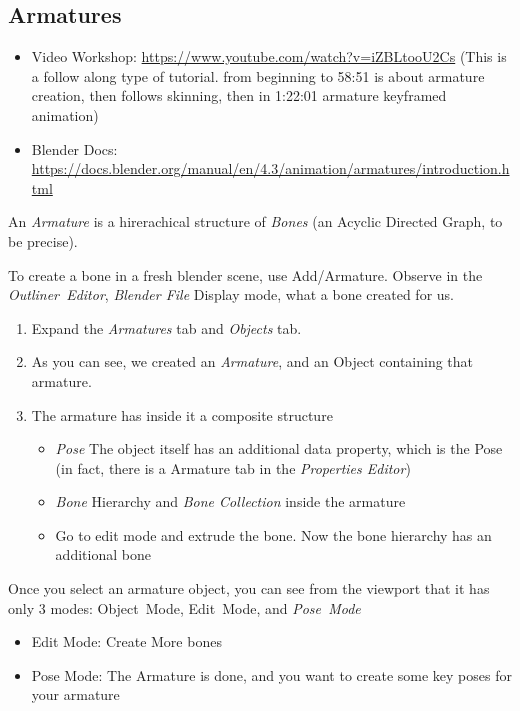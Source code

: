 \documentclass{article}
\begin{document}
\subsection{Armatures}
\begin{itemize}[noitemsep, topsep=0pt]
    \item Video Workshop: \href{https://www.youtube.com/watch?v=iZBLtooU2Cs}{https://www.youtube.com/watch?v=iZBLtooU2Cs} (This is a follow along type of tutorial. from beginning to 58:51 is about armature creation, then follows skinning, then in 1:22:01 armature keyframed animation)
    \item Blender Docs: \href{https://docs.blender.org/manual/en/4.3/animation/armatures/introduction.html}{https://docs.blender.org/manual/en/4.3/animation/armatures/introduction.html}
\end{itemize}
An \textit{Armature} is a hirerachical structure of \textit{Bones} (an Acyclic Directed Graph, to be precise).\par
To create a bone in a fresh blender scene, use \mbox{Add/Armature}. Observe in the \mbox{\textit{Outliner Editor}}, \textit{Blender File} Display mode, what a bone created for us.
\begin{enumerate}[noitemsep, topsep=0pt]
    \item Expand the \textit{Armatures} tab and \textit{Objects} tab.
    \item As you can see, we created an \textit{Armature}, and an Object containing that armature.
    \item The armature has inside it a composite structure
    \begin{itemize}[noitemsep, topsep=0pt]
        \item \textit{Pose} The object itself has an additional data property, which is the Pose (in fact, there is a Armature tab in the \textit{Properties Editor})
        \item \textit{Bone} Hierarchy and \textit{Bone Collection} inside the armature
        \item Go to edit mode and extrude the bone. Now the bone hierarchy has an additional bone
    \end{itemize}
\end{enumerate}
Once you select an armature object, you can see from the viewport that it has only 3 modes: \mbox{Object Mode}, \mbox{Edit Mode}, and \mbox{\textit{Pose Mode}}
\begin{itemize}[noitemsep, topsep=0pt]
    \item Edit Mode: Create More bones
    \item Pose Mode: The Armature is done, and you want to create some key poses for your armature
\end{itemize}
\end{document}
